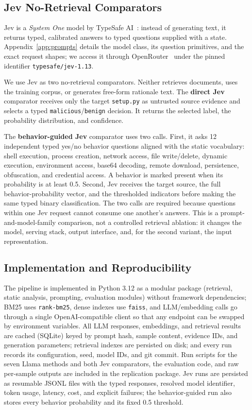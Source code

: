 \subsection{Jev No-Retrieval Comparators}
\label{sec:jev-method}

Jev is a \emph{System One} model by TypeSafe AI~\cite{typesafe2026jev}:
instead of generating text, it returns typed, calibrated answers to typed
questions supplied with a state. Appendix~\ref{app:prompts} details the model
class, its question primitives, and the exact request shapes; we access it
through OpenRouter~\cite{openrouterjev} under the pinned identifier
\texttt{typesafe/jev-1.13}.

We use Jev as two no-retrieval comparators. Neither retrieves documents, uses
the training corpus, or generates free-form rationale text.
The \textbf{direct Jev} comparator receives only the target
\texttt{setup.py} as untrusted source evidence and selects a typed
\texttt{malicious}/\texttt{benign} decision. It returns the selected label,
the probability distribution, and confidence.

The \textbf{behavior-guided Jev} comparator uses two calls. First, it asks 12
independent typed yes/no behavior questions aligned with the static vocabulary:
shell execution, process creation, network access, file write/delete, dynamic
execution, environment access, base64 decoding, remote download, persistence,
obfuscation, and credential access. A behavior is marked present when its
probability is at least 0.5. Second, Jev receives the target source, the full
behavior-probability vector, and the thresholded indicators before making the
same typed binary classification. The two calls are required because questions
within one Jev request cannot consume one another's answers. This is a
prompt-and-model-family comparison, not a controlled retrieval ablation: it
changes the model, serving stack, output interface, and, for the second
variant, the input representation.

\subsection{Implementation and Reproducibility}
\label{sec:implementation}

The pipeline is implemented in Python 3.12 as a modular package
(retrieval, static analysis, prompting, evaluation modules) without
framework dependencies; BM25 uses \texttt{rank-bm25}, dense indexes use
\texttt{faiss}, and LLM/embedding calls go through a single
OpenAI-compatible client so that any endpoint can be swapped by environment
variables. All LLM responses, embeddings, and retrieval results are cached
(SQLite) keyed by prompt hash, sample content, evidence IDs, and generation
parameters; retrieval indexes are persisted on disk; and every run records
its configuration, seed, model IDs, and git commit. Run scripts for the seven
Llama methods and both Jev comparators, the evaluation code, and raw per-sample
outputs are included in the replication package. Jev runs are persisted as resumable JSONL files with the
typed responses, resolved model identifier, token usage, latency, cost, and
explicit failures; the behavior-guided run also stores every behavior
probability and its fixed 0.5 threshold.
\endinput
